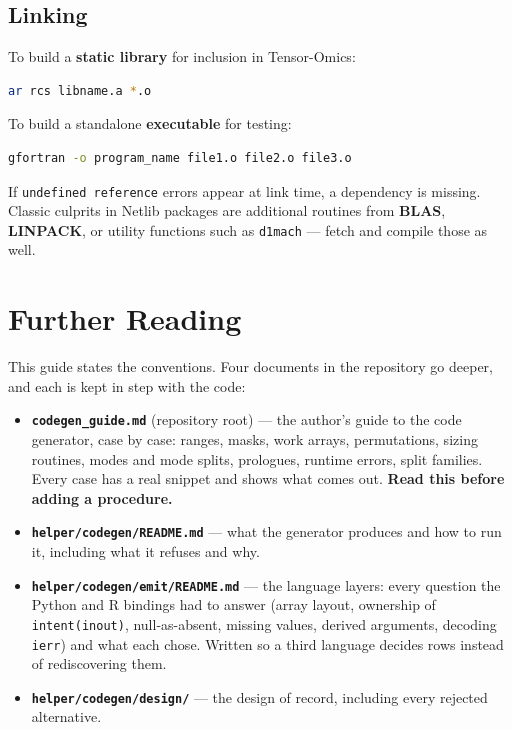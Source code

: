 \documentclass{article}
\begin{document}
\subsection{Linking}

To build a \textbf{static library} for inclusion in Tensor-Omics:

\begin{lstlisting}[language=bash]
ar rcs libname.a *.o
\end{lstlisting}

To build a standalone \textbf{executable} for testing:

\begin{lstlisting}[language=bash]
gfortran -o program_name file1.o file2.o file3.o
\end{lstlisting}

If \texttt{undefined reference} errors appear at link time, a dependency is missing. Classic culprits in Netlib packages are additional routines from \textbf{BLAS}, \textbf{LINPACK}, or utility functions such as \texttt{d1mach} — fetch and compile those as well.

\section{Further Reading}

This guide states the conventions. Four documents in the repository go deeper, and each is kept in
step with the code:

\begin{itemize}
  \item \textbf{\texttt{codegen\_guide.md}} (repository root) — the author's guide to the code
        generator, case by case: ranges, masks, work arrays, permutations, sizing routines, modes
        and mode splits, prologues, runtime errors, split families. Every case has a real snippet
        and shows what comes out. \textbf{Read this before adding a procedure.}
  \item \textbf{\texttt{helper/codegen/README.md}} — what the generator produces and how to run it,
        including what it refuses and why.
  \item \textbf{\texttt{helper/codegen/emit/README.md}} — the language layers: every question the
        Python and R bindings had to answer (array layout, ownership of \texttt{intent(inout)},
        null-as-absent, missing values, derived arguments, decoding \texttt{ierr}) and what each
        chose. Written so a third language decides rows instead of rediscovering them.
  \item \textbf{\texttt{helper/codegen/design/}} — the design of record, including every rejected
        alternative.
\end{itemize}
\end{document}
